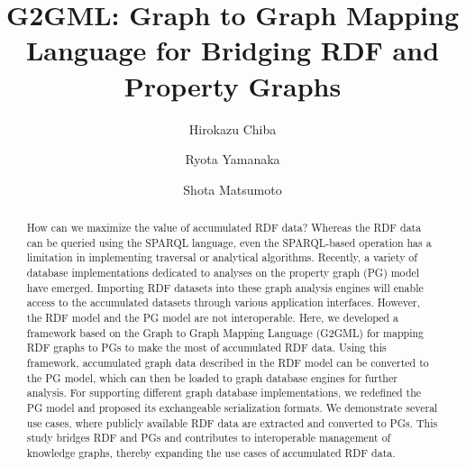 \documentclass[runningheads]{llncs}
\begin{document}
\newtheorem{defi}[theorem]{Definition}
\newtheorem*{prel}{Preliminaries}
%
\title{G2GML: Graph to Graph Mapping Language for Bridging RDF and Property Graphs} 
%
%
\author{Hirokazu Chiba \and Ryota Yamanaka \and Shota Matsumoto}
%
%
%
\maketitle
%
\begin{abstract}
How can we maximize the value of accumulated RDF data? Whereas the RDF data can be queried using the SPARQL language, even the SPARQL-based operation has a limitation in implementing traversal or analytical algorithms. Recently, a variety of database implementations dedicated to analyses on the property graph (PG) model have emerged. Importing RDF datasets into these graph analysis engines will enable access to the accumulated datasets through various application interfaces. However, the RDF model and the PG model are not interoperable. Here, we developed a framework based on the Graph to Graph Mapping Language (G2GML) for mapping RDF graphs to PGs to make the most of accumulated RDF data. Using this framework, accumulated graph data described in the RDF model can be converted to the PG model, which can then be loaded to graph database engines for further analysis. For supporting different graph database implementations, we redefined the PG model and proposed its exchangeable serialization formats. We demonstrate several use cases, where publicly available RDF data are extracted and converted to PGs. This study bridges RDF and PGs and contributes to interoperable management of knowledge graphs, thereby expanding the use cases of accumulated RDF data.


\end{abstract}
\end{document}
